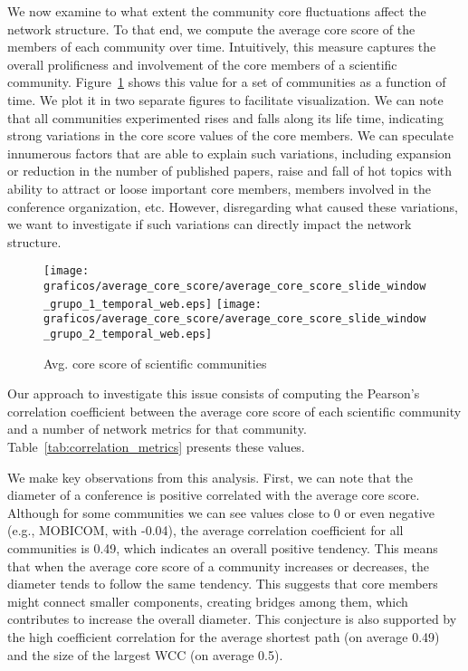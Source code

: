 We now examine to what extent the community core fluctuations affect the network structure.  To that end, we compute the average core score of the members of each community over
time. Intuitively, this measure captures the overall prolificness and involvement of the core members of a scientific community. Figure~\ref{fig:average_core_score} shows this value
for a set of communities as a function of time. We plot it in two separate figures to facilitate visualization. We can note that all communities experimented rises and falls along
its life time, indicating strong variations in the core score values of the core members. We can speculate innumerous factors that are able to explain such variations,
including expansion or reduction in the number of published papers, raise and fall of hot topics with ability to attract or loose important core members, members involved in the
conference organization, etc. However, disregarding what caused these variations, we want to investigate if such variations can directly impact the network structure.


\begin{figure}[!htb]
  \begin{center}
    \texttt{[image: graficos/average\_core\_score/average\_core\_score\_slide\_window\_grupo\_1\_temporal\_web.eps]}
    \texttt{[image: graficos/average\_core\_score/average\_core\_score\_slide\_window\_grupo\_2\_temporal\_web.eps]}
  \end{center}
  \vspace{-0.5cm}
  \caption{Avg. core score of scientific communities}
  \vspace{-0.5cm}
  \label{fig:average_core_score}
\end{figure}


Our approach to investigate this issue consists of computing the Pearson's correlation coefficient between the average core score of each scientific community and a number of
network metrics for that community. Table~\ref{tab:correlation_metrics} presents these values.

We make key observations from this analysis. First, we can note that the diameter of a conference is positive correlated with the average core score. Although for some communities
we can see values close to 0 or even negative (e.g., MOBICOM, with -0.04), the average correlation coefficient for all communities is 0.49, which indicates an overall
positive tendency. This means that when the average core score of a community increases or decreases, the diameter tends to follow the same tendency. This suggests that core 
members might connect smaller components, creating bridges among them, which contributes to increase the overall diameter. This conjecture is also supported by the high coefficient
correlation for the average shortest path (on average 0.49) and the size of the largest WCC (on average 0.5).

